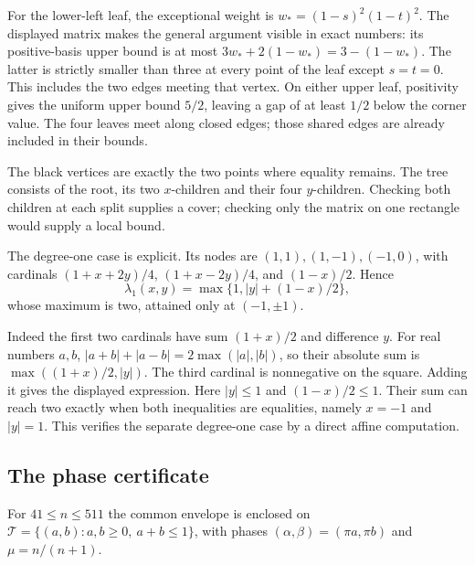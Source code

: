 For the lower-left leaf, the exceptional weight is
$w_*=(1-s)^2(1-t)^2$. The displayed matrix makes the general argument
visible in exact numbers: its positive-basis upper bound is at most
$3w_*+2(1-w_*)=3-(1-w_*)$. The latter is strictly smaller than three
at every point of the leaf except $s=t=0$. This includes the two edges
meeting that vertex. On either upper leaf, positivity gives the uniform
upper bound $5/2$, leaving a gap of at least $1/2$ below the corner value.
The four leaves meet along closed edges; those shared edges are already
included in their bounds.

\begin{center}
\end{center}
The black vertices are exactly the two points where equality remains.
The tree consists of the root, its two $x$-children and their four
$y$-children. Checking both children at each split supplies a cover;
checking only the matrix on one rectangle would supply a local bound.

The degree-one case is explicit. Its nodes
are $(1,1),(1,-1),(-1,0)$, with cardinals
$(1+x+2y)/4$, $(1+x-2y)/4$, and $(1-x)/2$. Hence
\[
 \lambda_1(x,y)=\max\{1,|y|+(1-x)/2\},
\]
whose maximum is two, attained only at $(-1,\pm1)$.

Indeed the first two cardinals have sum $(1+x)/2$ and difference $y$.
For real numbers $a,b$, $|a+b|+|a-b|=2\max(|a|,|b|)$, so their
absolute sum is $\max((1+x)/2,|y|)$. The third cardinal is
nonnegative on the square. Adding it gives the displayed expression.
Here $|y|\leq1$ and $(1-x)/2\leq1$. Their sum can reach two
exactly when both inequalities are equalities, namely $x=-1$ and
$|y|=1$. This verifies the separate degree-one case by a direct affine
computation.

\subsection{The phase certificate}
For $41\leq n\leq511$ the common envelope is enclosed on
$\mathcal T=\{(a,b):a,b\geq0,\ a+b\leq1\}$, with phases
$(\alpha,\beta)=(\pi a,\pi b)$ and $\mu=n/(n+1)$.

